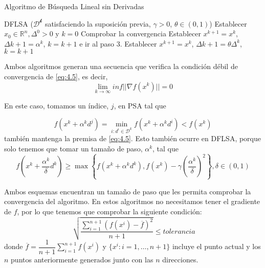 \begin{algorithm}[H]
\caption{Algoritmo de Búsqueda Lineal sin Derivadas}\label{alg:DFLSA}
\begin{algorithmic}[1]
\Procedure \textsc{DFLSA} ($\mathcal{D^k}$ satisfaciendo la suposición previa, $\gamma >0$, $\theta\in(0,1)$)
\State Establecer $x_0\in\mathbb{R}^n, \Delta^0>0$ y $k=0$
\State Comprobar la convergencia
	\State Establecer $x^{k+1} = x^k$, $\Delta k+1 = \alpha^k$, $k=k+1$ e ir al paso 3.
\Else
	\State Establecer $x^{k+1} = x^k$, $\Delta k+1=\theta\Delta^k$, $k = k+1$ 
\EndIf
\EndProcedure
\end{algorithmic}
\end{algorithm}

Ambos algoritmos generan una secuencia que verifica la condición débil de convergencia de \ref{eq:4.5}, es decir,
\begin{equation*}
\lim_{k\xrightarrow{}{}\infty} inf||\nabla f(x^k)|| = 0
\end{equation*}

En este caso, tomamos un índice, $j$, en PSA tal que 

\begin{equation*}
f(x^k+\alpha^kd^j) = \min_{i:d^i\in\mathcal{D}^k} f(x^k+\alpha^kd^i) < f(x^k)
\end{equation*}
también mantenga la premisa de \ref{eq:4.5}. 
Esto también ocurre en DFLSA, porque solo tenemos que tomar un tamaño de paso, $\alpha^k$, tal que
\begin{equation*}
f\left(x^k+\dfrac{\alpha^k}{\delta}d^k\right) \geq \max\left\lbrace f(x^k+\alpha^kd^k), f(x^k)-\gamma\left(\dfrac{\alpha^k}{\delta}\right)^2\right\rbrace, \delta\in(0,1)
\end{equation*}

Ambos esquemas encuentran un tamaño de paso que les permita comprobar la convergencia del algoritmo. 
En estos algoritmos no necesitamos tener el gradiente de $f$, por lo que tenemos que comprobar la siguiente condición:
\begin{equation}
\sqrt[]{\dfrac{\sum_{i=1}^{n+1} (f(x^i)-\overline{f})^2}{n+1}} \leq tolerancia
\label{eq:4.33}
\end{equation}
donde $\overline{f} = \dfrac{1}{n+1}\sum_{i=1}^{n+1}f(x^i)$ y $\{x^i : i=1,\dots,n+1\}$ incluye el punto actual y los $n$ puntos anteriormente generados junto con las $n$ direcciones. 

